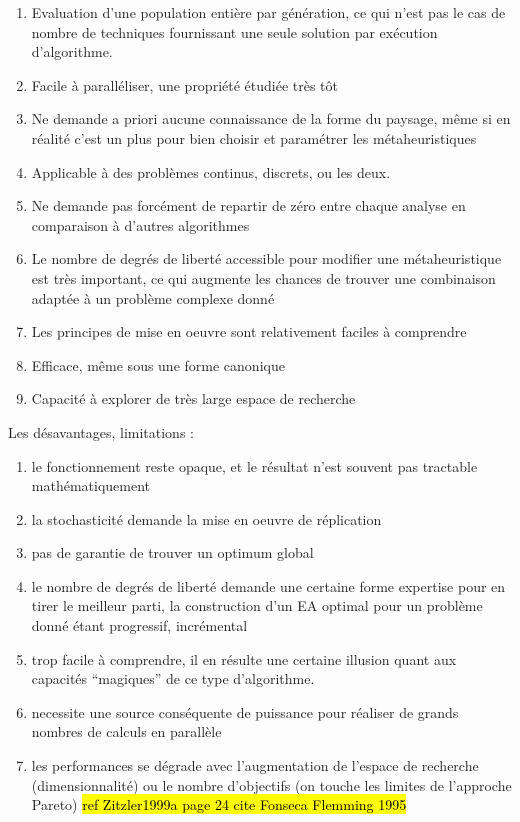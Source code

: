 \begin{enumerate}[label=(\alph*),labelindent=\parindent,leftmargin=*]
	
	\item Evaluation d'une population entière par génération, ce qui n'est pas le cas de nombre de techniques fournissant une seule solution par exécution d'algorithme.
	\item Facile à paralléliser, une propriété étudiée très tôt \autocite[444]{Alba2002} 
	\item Ne demande a priori aucune connaissance de la forme du paysage, même si en réalité c'est un plus pour bien choisir et paramétrer les métaheuristiques
	\item Applicable à des problèmes continus, discrets, ou les deux.
	\item Ne demande pas forcément de repartir de zéro entre chaque analyse en comparaison à d'autres algorithmes
	\item Le nombre de degrés de liberté accessible pour modifier une métaheuristique est très important, ce qui augmente les chances de trouver une combinaison adaptée à un problème complexe donné
	\item Les principes de mise en oeuvre sont relativement faciles à comprendre
    \item Efficace, même sous une forme canonique
    \item Capacité à explorer de très large espace de recherche
\end{enumerate}

Les désavantages, limitations : 

\begin{enumerate}[label=(\alph*),labelindent=\parindent,leftmargin=*]
	\item le fonctionnement reste opaque, et le résultat n'est souvent pas tractable mathématiquement
	\item la stochasticité demande la mise en oeuvre de réplication
	\item pas de garantie de trouver un optimum global
	\item le nombre de degrés de liberté demande une certaine forme expertise pour en tirer le meilleur parti, la construction d'un EA optimal pour un problème donné étant progressif, incrémental
    \item trop facile à comprendre, il en résulte une certaine illusion quant aux capacités \enquote{magiques} de ce type d'algorithme.
    \item necessite une source conséquente de puissance pour réaliser de grands nombres de calculs en parallèle 
    \item les performances se dégrade avec l'augmentation de l'espace de recherche (dimensionnalité) ou le nombre d'objectifs (on touche les limites de l'approche Pareto) \hl{ref Zitzler1999a page 24 cite Fonseca Flemming 1995}
\end{enumerate}


